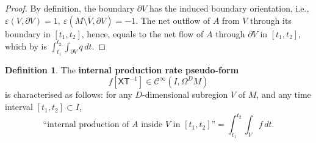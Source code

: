 \documentclass{elsarticle}
\theoremstyle{definition}
\newtheorem{definition}[theorem]{Definition}
\newcommand{\newterm}[1]{\textbf{#1}}
\newcommand{\amount}{\mathsf{X}}
\renewcommand{\time}{\mathsf{T}}
\begin{document}
\begin{proof}
  By definition, the boundary $\partial V$ has the induced boundary orientation, i.e.,
  $\varepsilon(V, \partial V) = 1,\ \varepsilon(M \setminus \overline{V}, \partial V) = -1$.
  The net outflow of $A$ from $V$ through its boundary in $[t_1, t_2]$, hence, equals to the net flow of $A$ through $\partial V$ in $[t_1, t_2]$,
  which by  is
  $\int_{t_1}^{t_2} \int_{\partial V} q\, d t$.
\end{proof}
\begin{definition}
  The \newterm{internal production rate pseudo-form}
  \begin{equation}
    \label{eq:continuum/internal_production_rate_definition}
    f [\amount \time^{-1}] \in \mathcal{C}^\infty(I, \Omega^D M)
  \end{equation}
  is characterised as follows: for any $D$-dimensional subregion $V$ of $M$, and any time interval $[t_1, t_2] \subset I$,
  \begin{equation}
    \label{eq:continuum/internal_production}
    \textrm{``internal production of $A$ inside $V$ in $[t_1, t_2]$''} = \int_{t_1}^{t_2} \int_V f\, d t.
  \end{equation}
\end{definition}
\end{document}
